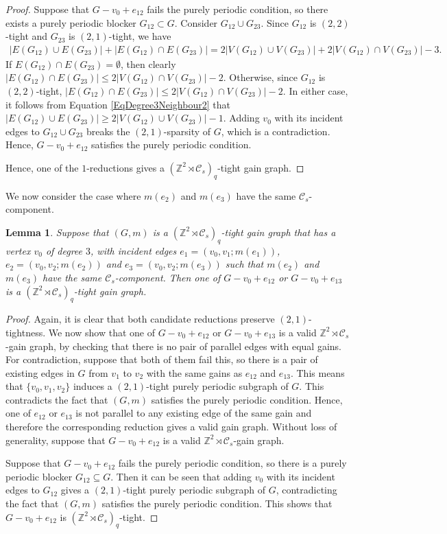 \documentclass[reqno,a4paper,10pt]{article}
\newtheorem{lemma}[theorem]{Lemma}
\theoremstyle{definition}
\theoremstyle{remark}
\numberwithin{equation}{section}
\numberwithin{figure}{section}
\numberwithin{table}{section}
\newcommand{\Z}{\mathbb{Z}}
\begin{document}
\begin{proof}
        Suppose that $G-v_0+e_{12}$ fails the purely periodic condition, so there exists a purely periodic blocker  $G_{12}\subset G$. Consider $G_{12}\cup G_{23}$.
        Since $G_{12}$ is $(2,2)$-tight and $G_{23}$ is $(2,1)$-tight, we have
		\begin{align}
			|E(G_{12})\cup E(G_{23})|+|E(G_{12})\cap E(G_{23})|
			=2|V(G_{12})\cup V(G_{23})|+2|V(G_{12})\cap V(G_{23})|-3.\label{EqDegree3Neighbour2}
		\end{align}
		If $E(G_{12})\cap E(G_{23})=\emptyset$, then clearly $|E(G_{12})\cap E(G_{23})|\leq2|V(G_{12})\cap V(G_{23})|-2$. Otherwise, since $G_{12}$ is $(2,2)$-tight, $|E(G_{12})\cap E(G_{23})|\leq2|V(G_{12})\cap V(G_{23})|-2$. In either case, it follows from Equation \eqref{EqDegree3Neighbour2} that $|E(G_{12})\cup E(G_{23})|\geq2|V(G_{12})\cup V(G_{23})|-1$. Adding $v_0$ with its incident edges to $G_{12}\cup G_{23}$ breaks the $(2,1)$-sparsity of $G$, which is a contradiction. Hence, $G-v_0+e_{12}$ satisfies the purely periodic condition.
		
        Hence, one of the $1$-reductions gives a $(\Z^2\rtimes\mathcal{C}_s)_q$-tight gain graph.
	\end{proof}
    We now consider the case where $m(e_2)$ and $m(e_3)$ have the same $\mathcal{C}_s$-component.
    \begin{lemma}\label{Degree3Neighbour2MatchLoop}
		Suppose that $(G,m)$ is a $(\Z^2\rtimes\mathcal{C}_s)_q$-tight gain graph that has a vertex $v_0$ of degree $3$, with incident edges $e_1=(v_0,v_1;m(e_1))$, $e_2=(v_0,v_2;m(e_2))$ and $e_3=(v_0,v_2;m(e_3))$ such that $m(e_2)$ and $m(e_3)$ have the same $\mathcal{C}_s$-component. Then one of $G-v_0+e_{12}$ or $G-v_0+e_{13}$ is a $(\Z^2\rtimes\mathcal{C}_s)_q$-tight gain graph.
	\end{lemma}
    \begin{proof}
        Again, it is clear that both candidate reductions preserve $(2,1)$-tightness. We now show that one of $G-v_0+e_{12}$ or $G-v_0+e_{13}$ is a valid $\Z^2\rtimes\mathcal{C}_s$-gain graph, by checking that there is no pair of parallel edges with equal gains. For contradiction, suppose that both of them fail this, so there is a pair of existing edges in $G$ from $v_1$ to $v_2$ with the same gains as $e_{12}$ and $e_{13}$. This means that $\{v_0,v_1,v_2\}$ induces a $(2,1)$-tight purely periodic subgraph of $G$.
		This contradicts the fact that $(G,m)$ satisfies the purely periodic condition. Hence, one of $e_{12}$ or $e_{13}$ is not parallel to any existing edge of the same gain and therefore the corresponding reduction gives a valid gain graph. Without loss of generality, suppose that $G-v_0+e_{12}$ is a valid $\Z^2\rtimes\mathcal{C}_s$-gain graph. 

        Suppose that $G-v_0+e_{12}$ fails the purely periodic condition, so there is a purely periodic blocker $G_{12}\subseteq G$. Then it can be seen that adding $v_0$ with its incident edges to $G_{12}$ gives a $(2,1)$-tight purely periodic subgraph of $G$, contradicting the fact that $(G,m)$ satisfies the purely periodic condition. This shows that $G-v_0+e_{12}$ is $(\Z^2\rtimes\mathcal{C}_s)_q$-tight.
    \end{proof}
\end{document}
